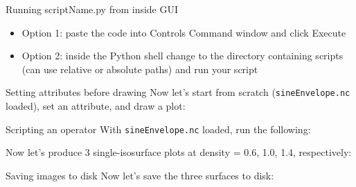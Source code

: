 \begin{frame}{Running scriptName.py from inside GUI}
  \begin{itemize}\setlength{\itemsep}{3mm}
  \item Option 1: paste the code into Controls \ra Command window and click Execute
  \item Option 2: inside the Python shell change to the directory containing scripts (can use relative or
    absolute paths) and run your script
    \runScript
  \end{itemize}
\end{frame}

\begin{frame}{Setting attributes before drawing}
  Now let's start from scratch (\texttt{sineEnvelope.nc} loaded), set an attribute, and draw a plot:
  
\end{frame}

\begin{frame}{Scripting an operator}
  With \texttt{sineEnvelope.nc} loaded, run the following:
  
  \pause\bigskip
  {\small Now let's produce 3 single-isosurface plots at density = 0.6, 1.0, 1.4, respectively:}
  
\end{frame}


\begin{frame}{Saving images to disk}
  \writeToDisk\pause
  Now let's save the three surfaces to disk:
  
\end{frame}

